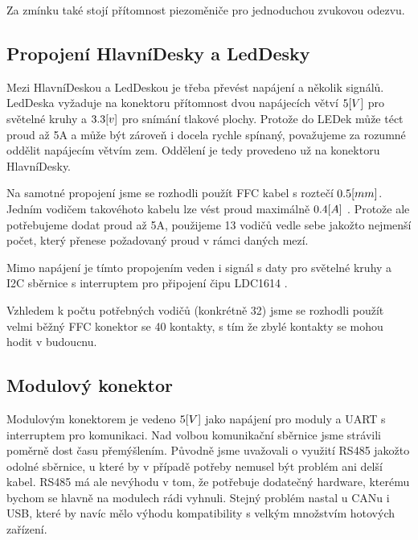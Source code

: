 Za zmínku také stojí přítomnost piezoměniče pro jednoduchou zvukovou odezvu. 

\subsection{Propojení HlavníDesky a LedDesky}
Mezi HlavníDeskou a LedDeskou je třeba převést napájení a několik signálů.
LedDeska vyžaduje na konektoru přítomnost dvou napájecích větví \(5\-[V]\) pro světelné kruhy a \(3.3\-[v]\) pro snímání tlakové plochy.
Protože do LEDek může téct proud až 5A a může být zároveň i docela rychle spínaný, považujeme za rozumné oddělit napájecím větvím zem.
Oddělení je tedy provedeno už na konektoru HlavníDesky.

Na samotné propojení jsme se rozhodli použít FFC kabel s roztečí \(0.5\-[mm]\).
Jedním vodičem takovéhoto kabelu lze vést proud maximálně \(0.4\-[A]\) \cite{FFC-konektor}.
Protože ale potřebujeme dodat proud až 5A, použijeme 13 vodičů vedle sebe jakožto nejmenší počet, který přenese požadovaný proud v rámci daných mezí.

Mimo napájení je tímto propojením veden i signál s daty pro světelné kruhy a I2C sběrnice s interruptem pro připojení čipu LDC1614 \cite{LDC1614}.

Vzhledem k počtu potřebných vodičů (konkrétně 32) jsme se rozhodli použít velmi běžný FFC konektor se 40 kontakty, s tím že zbylé kontakty se mohou hodit v budoucnu.

\subsection{Modulový konektor}
Modulovým konektorem je vedeno \(5\-[V]\) jako napájení pro moduly a UART s interruptem pro komunikaci.
Nad volbou komunikační sběrnice jsme strávili poměrně dost času přemýšlením.
Původně jsme uvažovali o využití RS485 jakožto odolné sběrnice, u které by v případě potřeby nemusel být problém ani delší kabel.
RS485 má ale nevýhodu v tom, že potřebuje dodatečný hardware, kterému bychom se hlavně na modulech rádi vyhnuli.
Stejný problém nastal u CANu i USB, které by navíc mělo výhodu kompatibility s velkým množstvím hotových zařízení.

